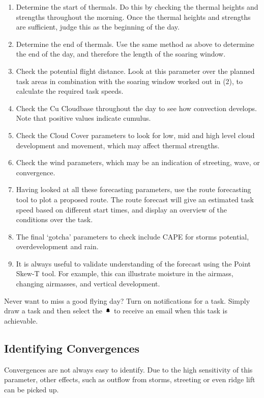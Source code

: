 \documentclass[11pt,a4paper]{article}
\begin{document}
\begin{enumerate}
\item Determine the start of thermals. Do this by checking the thermal heights and strengths throughout the morning. Once the thermal heights and strengths are sufficient, judge this as the beginning of the day.
\item Determine the end of thermals. Use the same method as above to determine the end of the day, and therefore the length of the soaring window.
\item Check the potential flight distance. Look at this parameter over the planned task areas in combination with the soaring window worked out in (2), to calculate the required task speeds.
\item Check the Cu Cloudbase throughout the day to see how convection develops. Note that positive values indicate cumulus.
\item Check the Cloud Cover  parameters to look for low, mid and high level cloud development and movement, which may affect thermal strengths.
\item Check the wind parameters, which may be an indication of streeting, wave, or convergence.
\item Having looked at all these forecasting parameters, use the route forecasting tool to plot a proposed route. The route forecast will give an estimated task speed based on different start times, and display an overview of the conditions over the task.
\item The final `gotcha' parameters to check include CAPE for storms potential, overdevelopment and rain.
\item It is always useful to validate understanding of the forecast using the Point Skew-T tool. For example, this can illustrate moisture in the airmass, changing airmasses, and vertical development.
\end{enumerate}

\begin{tip}
\item Never want to miss a good flying day? Turn on notifications for a task. Simply draw a task and then select the \includegraphics[height=9pt]{images/icons/bell.png} to receive an email when this task is achievable.
\end{tip}

\subsection{Identifying Convergences}
Convergences are not always easy to identify. Due to the high sensitivity of this parameter, other effects, such as outflow from storms, streeting or even ridge lift can be picked up. 
\end{document}
